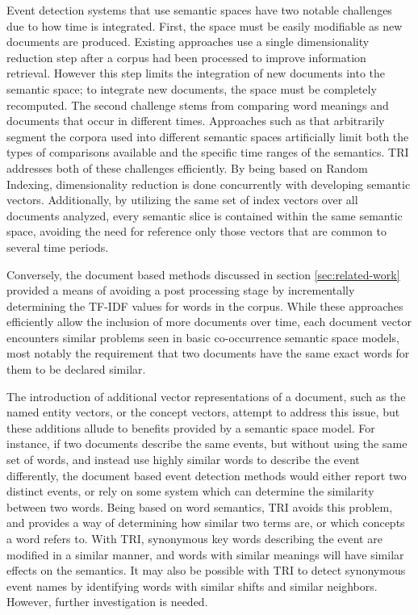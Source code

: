 \documentclass[a4paper,twocolumn,twoside,10pt]{ranlp}
\begin{document}
Event detection systems that use semantic spaces have two notable challenges due
to how time is integrated.  First, the space must be easily modifiable as new
documents are produced.  Existing approaches use a single dimensionality
reduction step after a corpus had been processed to improve information
retrieval. However this step limits the integration of new documents into the
semantic space; to integrate new documents, the space must be completely
recomputed.  The second challenge stems from comparing word meanings and
documents that occur in different times.  Approaches such as
\cite{kontostathis04use,fortuna09visualization} that arbitrarily segment the
corpora used into different semantic spaces artificially limit both the types of
comparisons available and the specific time ranges of the semantics.  TRI
addresses both of these challenges efficiently.  By being based on Random
Indexing, dimensionality reduction is done concurrently with developing semantic
vectors.  Additionally, by utilizing the same set of index vectors over all
documents analyzed, every semantic slice is contained within the same semantic
space, avoiding the need for reference only those vectors that are common to
several time periods.

Conversely, the document based methods discussed in section
\ref{sec:related-work} provided a means of avoiding a post processing stage by
incrementally determining the TF-IDF values for words in the corpus.  While
these approaches efficiently allow the inclusion of more documents over time,
each document vector encounters similar problems seen in basic co-occurrence
semantic space models, most notably the requirement that two documents have the
same exact words for them to be declared similar.  

The introduction of additional vector representations of a document, such as the
named entity vectors, or the concept vectors, attempt to address this issue, but
these additions allude to benefits provided by a semantic space model.  For
instance, if two documents describe the same events, but without using the same
set of words, and instead use highly similar words to describe the event
differently, the document based event detection methods would either report two
distinct events, or rely on some system which can determine the similarity
between two words.  Being based on word semantics, TRI avoids this problem, and
provides a way of determining how similar two terms are, or which concepts a
word refers to.  With TRI, synonymous key words describing the event are
modified in a similar manner, and words with similar meanings will have similar
effects on the semantics.  It may also be possible with TRI to detect synonymous
event names by identifying words with similar shifts and similar neighbors.
However, further investigation is needed.
\end{document}
